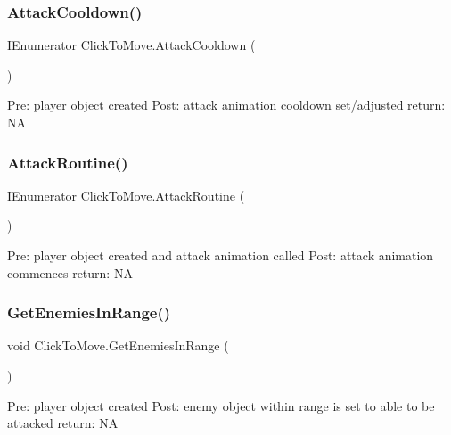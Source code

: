 \subsubsection{\texorpdfstring{Attack\+Cooldown()}{AttackCooldown()}}
{\footnotesize\ttfamily I\+Enumerator Click\+To\+Move.\+Attack\+Cooldown (\begin{DoxyParamCaption}{ }\end{DoxyParamCaption})\hspace{0.3cm}{\ttfamily [private]}}

Pre\+: player object created Post\+: attack animation cooldown set/adjusted return\+: NA \mbox{\label{class_click_to_move_a81c5db2ca3553c2bb0cd6473437a5561}} 
\subsubsection{\texorpdfstring{Attack\+Routine()}{AttackRoutine()}}
{\footnotesize\ttfamily I\+Enumerator Click\+To\+Move.\+Attack\+Routine (\begin{DoxyParamCaption}{ }\end{DoxyParamCaption})\hspace{0.3cm}{\ttfamily [private]}}

Pre\+: player object created and attack animation called Post\+: attack animation commences return\+: NA \mbox{\label{class_click_to_move_a12f6a353fabc43f592dd239da275b5e6}} 
\subsubsection{\texorpdfstring{Get\+Enemies\+In\+Range()}{GetEnemiesInRange()}}
{\footnotesize\ttfamily void Click\+To\+Move.\+Get\+Enemies\+In\+Range (\begin{DoxyParamCaption}{ }\end{DoxyParamCaption})\hspace{0.3cm}{\ttfamily [private]}}

Pre\+: player object created Post\+: enemy object within range is set to able to be attacked return\+: NA \mbox{\label{class_click_to_move_ad8ff402015f7fb9e9e850400ca47e47b}} 

